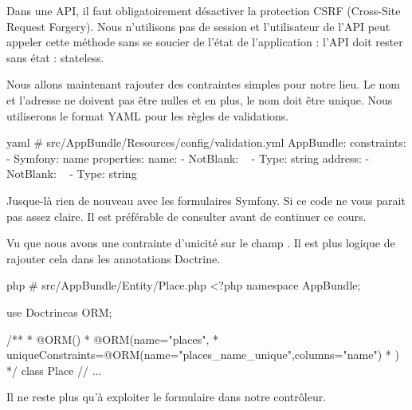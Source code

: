\documentclass[big]{zmdocument}
\begin{document}
Dans une API, il faut obligatoirement désactiver la protection CSRF (Cross-Site Request Forgery). Nous n'utilisons pas de session et l'utilisateur de l'API peut appeler cette méthode sans se soucier de l'état de l'application : l'API doit rester sans état : stateless.



Nous allons maintenant rajouter des contraintes simples pour notre lieu.
Le nom et l'adresse ne doivent pas être nulles et en plus, le nom doit être unique.
Nous utiliserons le format YAML pour les règles de validations.



\begin{CodeBlock}{yaml}
# src/AppBundle/Resources/config/validation.yml
AppBundle\Entity\Place:
    constraints:
        - Symfony\Bridge\Doctrine\Validator\Constraints\UniqueEntity: name
    properties:
        name:
            - NotBlank: ~
            - Type: string
        address:
            - NotBlank: ~
            - Type: string
\end{CodeBlock}



Jusque-là rien de nouveau avec les formulaires Symfony. Si ce code ne vous parait pas assez claire. Il est préférable de consulter  avant de continuer ce cours.



\begin{Information}
Vu que nous avons une contrainte d'unicité sur le champ . Il est plus logique de rajouter cela dans les annotations Doctrine.
\end{Information}


\begin{CodeBlock}{php}
# src/AppBundle/Entity/Place.php
<?php
namespace AppBundle\Entity;

use Doctrine\ORM\Mapping as ORM;

/**
 * @ORM\Entity()
 * @ORM\Table(name="places",
 *      uniqueConstraints={@ORM\UniqueConstraint(name="places_name_unique",columns={"name"})}
 * )
 */
class Place
{
    // ...
}
\end{CodeBlock}



Il ne reste plus qu'à exploiter le formulaire dans notre contrôleur.
\end{document}
